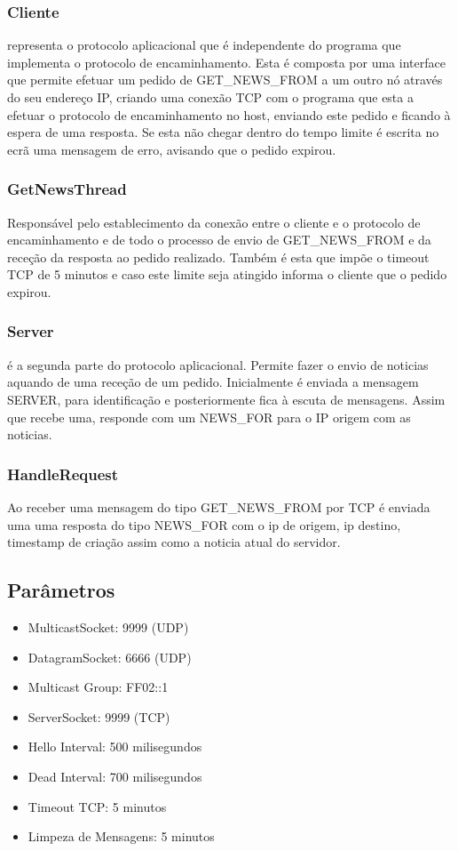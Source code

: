 \documentclass{llncs}
\begin{document}
\subsubsection{Cliente} representa o protocolo aplicacional que é independente do programa que implementa o protocolo de encaminhamento. Esta é composta por uma interface que permite efetuar um pedido de GET\_NEWS\_FROM a um outro nó através do seu endereço IP, criando uma conexão TCP com o programa que esta a efetuar o protocolo de encaminhamento no host, enviando este pedido e ficando à espera de uma resposta. Se esta não chegar dentro do tempo limite é escrita no ecrã uma mensagem de erro, avisando que o pedido expirou.

\subsubsection{GetNewsThread} Responsável pelo establecimento da conexão entre o cliente e o protocolo de encaminhamento e de todo o processo de envio de GET\_NEWS\_FROM e da receção da resposta ao pedido realizado. Também é esta que impõe o timeout TCP de 5 minutos e caso este limite seja atingido informa o cliente que o pedido expirou.


\subsubsection{Server} é a segunda parte do protocolo aplicacional. Permite fazer o envio de noticias aquando de uma receção de um pedido. Inicialmente é enviada a mensagem SERVER, para identificação e posteriormente fica à escuta de mensagens. Assim que recebe uma, responde com um NEWS\_FOR para o IP origem com as noticias.

\subsubsection{HandleRequest} Ao receber uma mensagem do tipo GET\_NEWS\_FROM por TCP é enviada uma uma resposta do tipo NEWS\_FOR com o ip de origem, ip destino, timestamp de criação assim como a noticia atual do servidor.

\subsection{Parâmetros}

\begin{itemize}
    \item MulticastSocket: 9999 (UDP)
    \item DatagramSocket: 6666 (UDP)
    \item Multicast Group: FF02::1
    \item ServerSocket: 9999 (TCP)
    \item Hello Interval: 500 milisegundos
    \item Dead Interval: 700 milisegundos
    \item Timeout TCP: 5 minutos
    \item Limpeza de Mensagens: 5 minutos
\end{itemize}
\end{document}
